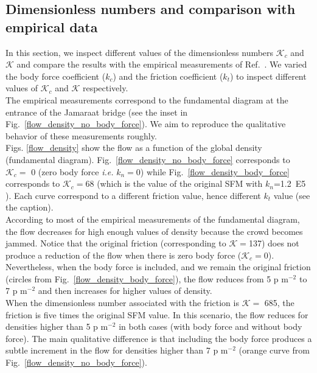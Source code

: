 \documentclass[preprint,12pt]{elsarticle}
\begin{document}
\subsection{Dimensionless numbers and comparison with empirical data}


In this section, we inspect different values of the dimensionless numbers $\mathcal{K}_c$ and $\mathcal{K}$ and compare the results with the empirical measurements of Ref.~\cite{helbing_2007}. We varied the body force coefficient ($k_c$) and the friction coefficient ($k_t$) to inspect different values of $\mathcal{K}_c$ and $\mathcal{K}$ respectively.\\

The empirical measurements correspond to the fundamental diagram at the entrance of the Jamaraat bridge (see the inset in Fig.~\ref{flow_density_no_body_force}). We aim to reproduce the qualitative behavior of these measurements roughly.\\

Figs. \ref{flow_density} show the flow as a function of the global density (fundamental diagram). Fig.~\ref{flow_density_no_body_force} corresponds to $\mathcal{K}_c=$ 0 (zero body force \textit{i.e.} $k_n=0$) while Fig.~\ref{flow_density_body_force} corresponds to $\mathcal{K}_c=$68 (which is the value of the original SFM with $k_n$=1.2~E5 ). Each curve correspond to a different friction value, hence different $k_t$ value (see the caption).\\

According to most of the empirical measurements of the fundamental diagram, the flow decreases for high enough values of density because the crowd becomes jammed. Notice that the original friction (corresponding to $\mathcal{K}=$137) does not produce a reduction of the flow when there is zero body force ($\mathcal{K}_c=$0). Nevertheless, when the body force is included, and we remain the original friction (circles from Fig.~\ref{flow_density_body_force}), the flow reduces from  5 p m$^{-2}$ to 7 p m$^{-2}$ and then increases for higher values of density.\\

When the dimensionless number associated with the friction is $\mathcal{K} = $ 685, the friction is five times the original SFM value. In this scenario, the flow reduces for densities higher than 5 p m$^{-2}$ in both cases (with body force and without body force). The main qualitative difference is that including the body force produces a subtle increment in the flow for densities higher than 7 p m$^{-2}$ (orange curve from Fig.~\ref{flow_density_no_body_force}). \\
\end{document}
